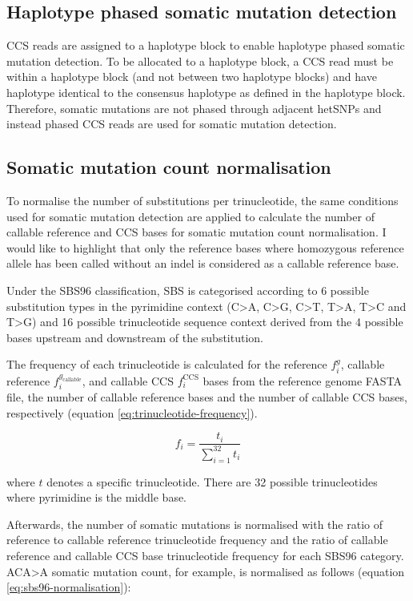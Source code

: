 \subsection{Haplotype phased somatic mutation detection}

CCS reads are assigned to a haplotype block to enable haplotype phased somatic mutation detection. To be allocated to a haplotype block, a CCS read must be within a haplotype block (and not between two haplotype blocks) and have haplotype identical to the consensus haplotype as defined in the haplotype block. Therefore, somatic mutations are not phased through adjacent hetSNPs and instead phased CCS reads are used for somatic mutation detection. 

\subsection{Somatic mutation count normalisation}
\label{sec:somatic_mutation_count_normalisation}
To normalise the number of substitutions per trinucleotide, the same conditions used for somatic mutation detection are applied to calculate the number of callable reference and CCS bases for somatic mutation count normalisation. I would like to highlight that only the reference bases where homozygous reference allele has been called without an indel is considered as a callable reference base. 

Under the SBS96 classification, SBS is categorised according to 6 possible substitution types in the pyrimidine context (C>A, C>G, C>T, T>A, T>C and T>G) and 16 possible trinucleotide sequence context derived from the 4 possible bases upstream and downstream of the substitution. 

The frequency of each trinucleotide is calculated for the reference $f^{g}_{i}$, callable reference $f^{g_{\text{callable}}}_{i}$, and callable CCS $f^{\text{CCS}}_{i}$ bases from the reference genome FASTA file, the number of callable reference bases and the number of callable CCS bases, respectively (equation \ref{eq:trinucleotide-frequency}). 

\begin{equation} \label{eq:trinucleotide-frequency}
f_{i} = \frac{t_{i}}{\sum^{32}_{i=1} t_{i}}
\end{equation}

where $t$ denotes a specific trinucleotide. There are 32 possible trinucleotides where pyrimidine is the middle base. 

Afterwards, the number of somatic mutations is normalised with the ratio of reference to callable reference trinucleotide frequency and the ratio of callable reference and callable CCS base trinucleotide frequency for each SBS96 category. ACA>A somatic mutation count, for example, is normalised as follows (equation \ref{eq:sbs96-normalisation}):

